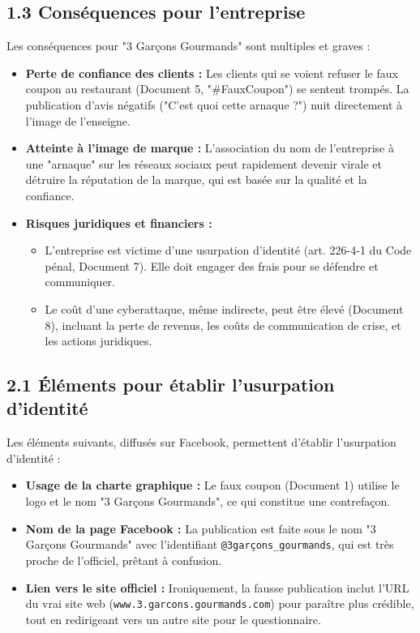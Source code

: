 \documentclass[12pt,a4paper]{article}
\begin{document}
\subsection*{1.3 Conséquences pour l'entreprise}
Les conséquences pour "3 Garçons Gourmands" sont multiples et graves :
\begin{itemize}
    	\item \textbf{Perte de confiance des clients :} Les clients qui se voient refuser le faux coupon au restaurant (Document 5, "\#FauxCoupon") se sentent trompés. La publication d'avis négatifs ("C'est quoi cette arnaque ?") nuit directement à l'image de l'enseigne.
    	\item \textbf{Atteinte à l'image de marque :} L'association du nom de l'entreprise à une "arnaque" sur les réseaux sociaux peut rapidement devenir virale et détruire la réputation de la marque, qui est basée sur la qualité et la confiance.
    	\item \textbf{Risques juridiques et financiers :} 
    	\begin{itemize}
        		\item L'entreprise est victime d'une usurpation d'identité (art. 226-4-1 du Code pénal, Document 7). Elle doit engager des frais pour se défendre et communiquer.
        		\item Le coût d'une cyberattaque, même indirecte, peut être élevé (Document 8), incluant la perte de revenus, les coûts de communication de crise, et les actions juridiques.
    	\end{itemize}
\end{itemize}

\subsection*{2.1 Éléments pour établir l'usurpation d'identité}
Les éléments suivants, diffusés sur Facebook, permettent d'établir l'usurpation d'identité :
\begin{itemize}
    	\item \textbf{Usage de la charte graphique :} Le faux coupon (Document 1) utilise le logo et le nom "3 Garçons Gourmands", ce qui constitue une contrefaçon.
    	\item \textbf{Nom de la page Facebook :} La publication est faite sous le nom "3 Garçons Gourmands" avec l'identifiant \texttt{@3garçons_gourmands}, qui est très proche de l'officiel, prêtant à confusion.
    	\item \textbf{Lien vers le site officiel :} Ironiquement, la fausse publication inclut l'URL du vrai site web (\texttt{www.3.garcons.gourmands.com}) pour paraître plus crédible, tout en redirigeant vers un autre site pour le questionnaire.
\end{itemize}
\end{document}
